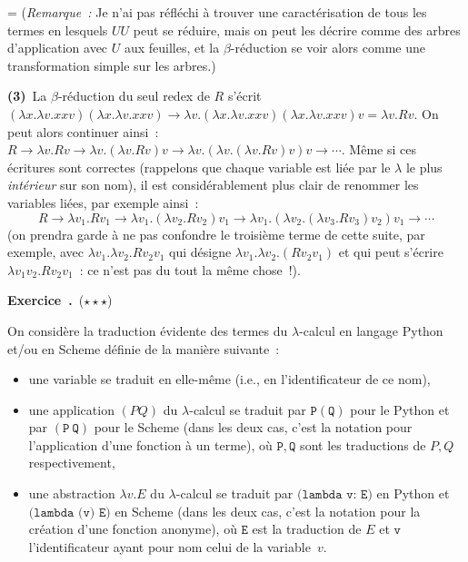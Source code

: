 \documentclass[12pt,a4paper]{article}
\theoremstyle{definition}
\newcommand\exercice{%
\refstepcounter{comcnt}\bigskip\noindent\textbf{Exercice~\thecomcnt.}}
\newif\ifcorrige
\newenvironment{corrige}%
{\ifcorrige\relax\else\setbox0=\vbox\bgroup\fi%
\smallbreak\footnotesize\noindent{\underbar{\textit{Corrigé.}}\quad}}
{{\hbox{}\nobreak\hfill\checkmark}%
\ifcorrige\relax\else\egroup\fi\par}
\begin{document}
\begin{corrige}
(\emph{Remarque :} Je n'ai pas réfléchi à trouver une caractérisation
de tous les termes en lesquels $UU$ peut se réduire, mais on peut les
décrire comme des arbres d'application avec $U$ aux feuilles, et la
$\beta$-réduction se voir alors comme une transformation simple sur
les arbres.)

\textbf{(3)} La $\beta$-réduction du seul redex de $R$ s'écrit
$(\lambda x.\lambda v.xxv) (\lambda x.\lambda v.xxv) \rightarrow
\lambda v.(\lambda x.\lambda v.xxv)(\lambda x.\lambda v.xxv)v =
\lambda v. R v$.  On peut alors continuer ainsi : $R \rightarrow
\lambda v. Rv \rightarrow \lambda v. (\lambda v. Rv)v \rightarrow
\lambda v. (\lambda v. (\lambda v. Rv)v)v \rightarrow \cdots$.  Même
si ces écritures sont correctes (rappelons que chaque variable est
liée par le $\lambda$ le plus \emph{intérieur} sur son nom), il est
considérablement plus clair de renommer les variables liées, par
exemple ainsi :
\[
R \rightarrow
\lambda v_1. Rv_1 \rightarrow \lambda v_1. (\lambda v_2. Rv_2)v_1 \rightarrow
\lambda v_1. (\lambda v_2. (\lambda v_3. Rv_3)v_2)v_1 \rightarrow \cdots
\]
(on prendra garde à ne pas confondre le troisième terme de cette
suite, par exemple, avec $\lambda v_1. \lambda v_2. Rv_2v_1$ qui
désigne $\lambda v_1. \lambda v_2. (Rv_2v_1)$ et qui peut s'écrire
$\lambda v_1 v_2. Rv_2v_1$ : ce n'est pas du tout la même chose !).
\end{corrige}

%

\exercice\label{exercise-traduction-entiers-de-church}\ (${\star}{\star}{\star}$)\par\nobreak

On considère la traduction évidente des termes du $\lambda$-calcul
en langage Python et/ou en Scheme définie de la manière suivante :
\begin{itemize}
\item une variable se traduit en elle-même (i.e., en
  l'identificateur de ce nom),
\item une application $(P Q)$ du $\lambda$-calcul se traduit par
  $\mathtt{P}(\mathtt{Q})$ pour le Python et par $(\mathtt{P}\ 
  \mathtt{Q})$ pour le Scheme (dans les deux cas, c'est la notation
  pour l'application d'une fonction à un terme), où
  $\mathtt{P},\mathtt{Q}$ sont les traductions de $P,Q$
  respectivement,
\item une abstraction $\lambda v. E$ du $\lambda$-calcul se traduit
  par $\texttt{(lambda $\mathtt{v}$: $\mathtt{E}$)}$ en Python et
  $\texttt{(lambda ($\mathtt{v}$) $\mathtt{E}$)}$ en Scheme (dans les
  deux cas, c'est la notation pour la création d'une fonction
  anonyme), où $\mathtt{E}$ est la traduction de $E$ et $\mathtt{v}$
  l'identificateur ayant pour nom celui de la variable $v$.
\end{itemize}
\end{document}
